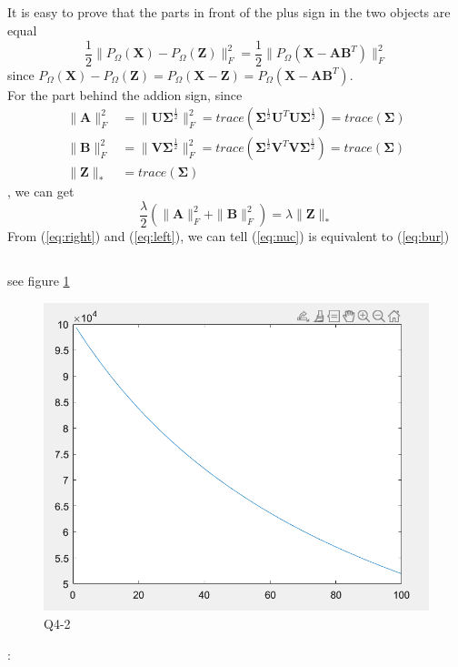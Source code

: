 \documentclass[11pt]{article}
\newcommand{\mfile}[1]  {{\small }} %
\newcommand{\mtx}[1]{\mathbf{#1}}
\def \mA {\mtx{A}}
\def \mB {\mtx{B}}
\def \mU {\mtx{U}}
\def \mV {\mtx{V}}
\def \mSigma {\mtx{\Sigma}}
\def \mX {\mtx{X}}
\def \mZ {\mtx{Z}}
\begin{document}
\subsection{}
It is easy to prove that the parts in front of the plus sign in the two objects are equal  
\begin{equation}\label{eq:right}
	\frac{1}{2}\|P_\Omega(\mX)-P_\Omega(\mZ)\|_F^2 = \frac{1}{2}\|P_\Omega(\mX-\mA\mB^T)\|_F^2
\end{equation}
since $P_\Omega(\mX)-P_\Omega(\mZ) = P_\Omega(\mX-\mZ) =P_\Omega(\mX-\mA\mB^T)$.\\
For the part behind the addion sign, since
\begin{align*}
	\|\mA\|_F^2 &= \|\mU\mSigma^\frac{1}{2}\|_F^2 = trace(\mSigma^\frac{1}{2}\mU^T\mU\mSigma^\frac{1}{2}) = trace(\mSigma)\\
	\|\mB\|_F^2 &= \|\mV\mSigma^\frac{1}{2}\|_F^2 = trace(\mSigma^\frac{1}{2}\mV^T\mV\mSigma^\frac{1}{2}) = trace(\mSigma)\\
	\|\mZ\|_* &= trace(\mSigma)
\end{align*},
we can get \
\begin{equation}\label{eq:left}
	\frac{\lambda}{2}(\|\mA\|_F^2+\|\mB\|^2_F) = \lambda\|\mZ\|_*
\end{equation}
From (\ref{eq:right}) and (\ref{eq:left}), we can tell (\ref{eq:nuc}) is equivalent to (\ref{eq:bur})
\subsection{}
see figure \ref{fig:Q4_2}
\mfile{q4_2.m} 
		\begin{figure}[h!]
			\centering
			\includegraphics[width=0.5\linewidth]{q4_2.png}
			\caption{Q4-2}
			\label{fig:Q4_2}
		\end{figure}:
\end{document}
